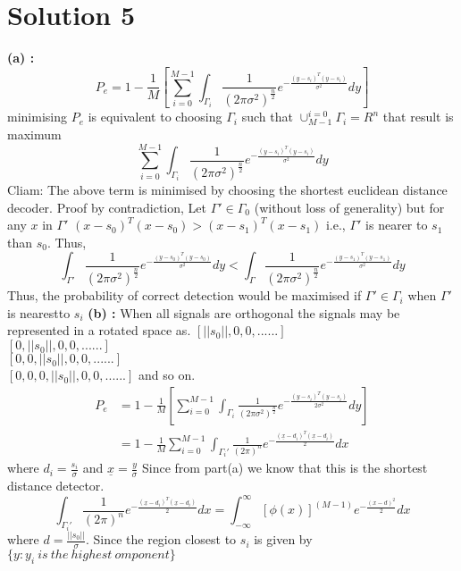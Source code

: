 \documentclass[a4paper,english,12pt]{article}
\begin{document}
\section{Solution 5}
\textbf{(a) :}
\begin{equation*}
P_{e}=1-\frac{1}{M}\left[\sum\limits_{i=0}^{M-1}\int_{\Gamma_{i}}\frac{1}{({2\pi\sigma^2})^\frac{n}{2}}  e^{-\frac{(y-s_{i})^T(y-s_{i})}{\sigma^2}}dy\right]
\end{equation*} 
minimising $P_{e}$  is equivalent to choosing  $\Gamma_{i}$  such that  $ \cup^{i=0}_{M-1}\Gamma_{i}=R^n $  
that result is maximum
\begin{equation*}
\sum\limits_{i=0}^{M-1}\int_{\Gamma_{i}}\frac{1}{({2\pi\sigma^2})^\frac{n}{2}}  e^{-\frac{(y-s_{i})^T(y-s_{i})}{\sigma^2}}dy
\end{equation*}
Cliam: The above term is minimised by choosing the shortest euclidean distance decoder.
Proof by contradiction,
Let $ \Gamma'\in \Gamma_{0} $ (without loss of generality) but for any $x$ in $\Gamma'$
${(x-s_{0})^T(x-s_{0})}>{(x-s_{1})^T(x-s_{1})}$ i.e.,  $\Gamma'$ is nearer to $s_{1}$ than $s_{0}$.
Thus,
\begin{equation*}
\int_{\Gamma'}\frac{1}{({2\pi\sigma^2})^\frac{n}{2}}  e^{-\frac{(y-s_{0})^T(y-s_{0})}{\sigma^2}}dy < \int_{\Gamma}\frac{1}{({2\pi\sigma^2})^\frac{n}{2}}  e^{-\frac{(y-s_{1})^T(y-s_{1})}{\sigma^2}}dy
\end{equation*}
Thus, the probability of correct detection would be maximised if $\Gamma' \in \Gamma_{i} $ when $\Gamma'$ is nearestto $s_{i}$\newline
 \textbf{(b) :} When all signals are orthogonal the signals may be represented in a rotated space as.
$[||s_{0}||,0,0,......]$\\
$[0 ,||s_{0}||,0,0,......]$\\
$[0,0,||s_{0}||,0,0,......]$\\
$[0,0,0,||s_{0}||,0,0,......]$
and so on.
\begin{align*}
P_{e}&=1-\frac{1}{M}\left[\sum\limits_{i=0}^{M-1}\int_{\Gamma_{i}}\frac{1}{({2\pi\sigma^2})^\frac{n}{2}}  e^{-\frac{(y-s_{i})^T(y-s_{i})}{2\sigma^2}}dy\right]\\
	&= 1-\frac{1}{M}\sum\limits_{i=0}^{M-1}\int_{\Gamma_{i}'}\frac{1}{({2\pi})^{n}}  e^{-\frac{(\underline{x}-d_{i})^T(\underline{x}-d_{i})}{2} }dx
\end{align*}
where $d_{i}=\frac{s_{i}}{\sigma}$ and $\underline{x}=\frac{y}{\sigma}$
Since from part(a) we know that this is the shortest distance detector.
\begin{equation*}
\int_{\Gamma_{i}'}\frac{1}{({2\pi})^{n}}  e^{-\frac{(\underline{x}-d_{i})^T(\underline{x}-d_{i})}{2}} dx = \int_{-\infty}^{\infty}[\phi(x)]^{(M-1)}e^{-\frac{(x-d)^2}{2}}dx
\end{equation*}
where $ d=\frac{||s_{0}||}{\sigma}$.
Since the region closest to $s_{i}$ is given by $\{ y :y_{i} \ is\ the\ highest\ omponent\}$
\end{document}
